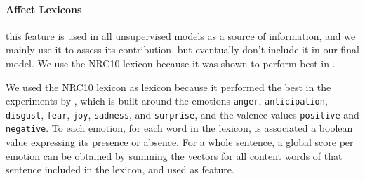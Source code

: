 \documentclass[11pt]{article}
\newcommand{\note}[1]{\textbf{*** #1 ***}}
\begin{document}
%

\paragraph{Affect Lexicons} this feature is used in all unsupervised models as a source of information, and we mainly use it to assess its contribution, but eventually don't include it in our final model. We use the NRC10 lexicon because it was shown to perform best in \cite{mohammad:2012:NAACL-HLT}.

We used the NRC10 lexicon as lexicon because it performed the best in the experiments by \cite{mohammad:2012:NAACL-HLT}, which is built around the emotions \texttt{anger}, \texttt{anticipation}, \texttt{disgust}, \texttt{fear}, \texttt{joy}, \texttt{sadness}, and \texttt{surprise}, and the valence values \texttt{positive} and \texttt{negative}. To each emotion, for each word in the lexicon, is associated a boolean value expressing its presence or absence. For a whole sentence, a global score per emotion can be obtained by summing the vectors for all content words of that sentence included in the lexicon, and used as feature.
%
\end{document}

